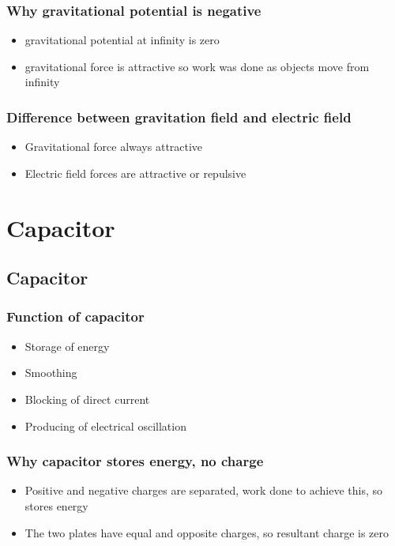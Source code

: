 \documentclass[a4paper,9pt]{scrartcl}
\begin{document}
    \subsubsection{Why gravitational potential is negative}
    \begin{itemize}
        \item gravitational potential at infinity is zero
        \item gravitational force is attractive so work was done as objects move from infinity
    \end{itemize}

    \subsubsection{Difference between gravitation field and electric field}
    \begin{itemize}
        \item Gravitational force always attractive
        \item Electric field forces are attractive or repulsive
    \end{itemize}


    \section{Capacitor}

    \subsection{Capacitor}

    \subsubsection{Function of capacitor}
    \begin{itemize}
        \item Storage of energy
        \item Smoothing
        \item Blocking of direct current
        \item Producing of electrical oscillation
    \end{itemize}

    \subsubsection{Why capacitor stores energy, no charge}
    \begin{itemize}
        \item Positive and negative charges are separated, work done to achieve this, so stores energy
        \item The two plates have equal and opposite charges, so resultant charge is zero
    \end{itemize}
\end{document}
